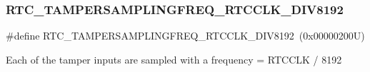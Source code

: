 \subsubsection{\texorpdfstring{R\+T\+C\+\_\+\+T\+A\+M\+P\+E\+R\+S\+A\+M\+P\+L\+I\+N\+G\+F\+R\+E\+Q\+\_\+\+R\+T\+C\+C\+L\+K\+\_\+\+D\+I\+V8192}{RTC\_TAMPERSAMPLINGFREQ\_RTCCLK\_DIV8192}}
{\footnotesize\ttfamily \#define R\+T\+C\+\_\+\+T\+A\+M\+P\+E\+R\+S\+A\+M\+P\+L\+I\+N\+G\+F\+R\+E\+Q\+\_\+\+R\+T\+C\+C\+L\+K\+\_\+\+D\+I\+V8192~(0x00000200\+U)}

Each of the tamper inputs are sampled with a frequency = R\+T\+C\+C\+LK / 8192 